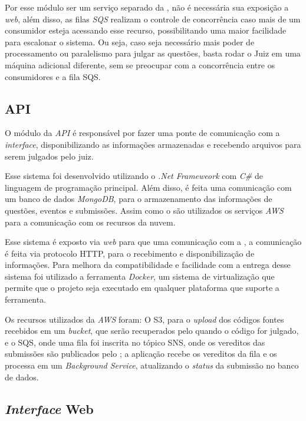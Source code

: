 Por esse módulo ser um serviço separado da , não é necessária sua exposição a \textit{web}, além disso, as filas \textit{SQS} realizam o controle de concorrência caso mais de um consumidor esteja acessando esse recurso, possibilitando uma maior facilidade para escalonar o sistema. Ou seja, caso seja necessário mais poder de processamento ou paralelismo para julgar as questões, basta rodar o Juiz em uma máquina adicional diferente, sem se preocupar com a concorrência entre os consumidores e a fila SQS. 

\subsection{API} 
\label{subsec:api}

O módulo da \textit{API} é responsável por fazer uma ponte de comunicação com a \textit{interface}, disponibilizando as informações armazenadas e recebendo arquivos para serem julgados pelo juiz. %

Esse sistema foi desenvolvido utilizando o \textit{.Net Frameweork} com \textit{C\#} de linguagem de programação principal. Além disso, é feita uma comunicação com um banco de dados \textit{MongoDB}, para o armazenamento das informações de questões, eventos e submissões. Assim como o  são utilizados os serviços \textit{AWS} para a comunicação com os recursos da nuvem. 

Esse sistema é exposto via \textit{web} para que uma comunicação com a , a comunicação é feita via protocolo HTTP, para o recebimento e disponibilização de informações. Para melhora da compatibilidade e facilidade com a entrega desse sistema foi utilizado a ferramenta \textit{Docker}, um sistema de virtualização que permite que o projeto seja executado em qualquer plataforma que suporte a ferramenta.

Os recursos utilizados da \textit{AWS} foram: O S3, para o \textit{upload} dos códigos fontes recebidos em um \textit{bucket}, que serão recuperados pelo  quando o código for julgado, e o SQS, onde uma fila foi inscrita no tópico SNS, onde os vereditos das submissões são publicados pelo ; a aplicação recebe os vereditos da fila e os processa em um \textit{Background Service}, atualizando o \textit{status} da submissão no banco de dados.

\subsection{\textit{Interface} Web} 
\label{subsec:interface}

